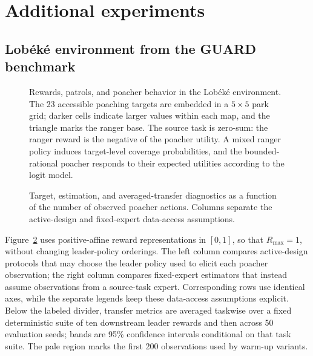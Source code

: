 \section{Additional experiments}

\subsection{Lob\'ek\'e environment from the GUARD benchmark}



\begin{figure}[H]
  \centering
  \resizebox{0.94\textwidth}{!}{%
  }
  \caption{Rewards, patrols, and poacher behavior in the Lob\'ek\'e environment.
  The 23 accessible poaching targets are embedded in a $5\times5$ park grid;
  darker cells indicate larger values within each map, and the triangle marks
  the ranger base. The source task is zero-sum: the ranger reward is the
  negative of the poacher utility. A mixed ranger policy induces target-level
  coverage probabilities, and the bounded-rational poacher responds to their
  expected utilities according to the logit model.}
  \label{fig:appendix-lobeke-environment}
\end{figure}

\begin{figure}[p]
  \centering
  \resizebox{\textwidth}{!}{%
  }
  \caption{Target, estimation, and averaged-transfer diagnostics as a function
  of the number of observed poacher actions. Columns separate the active-design
  and fixed-expert data-access assumptions.}
  \label{fig:appendix-lobeke-diagnostics}
\end{figure}
\clearpage

Figure~\ref{fig:appendix-lobeke-diagnostics} uses positive-affine reward
representations in $[0,1]$, so that $R_{\max}=1$, without changing leader-policy
orderings. The left column compares active-design protocols that may choose the
leader policy used to elicit each poacher observation; the right column compares
fixed-expert estimators that instead assume observations from a source-task
expert. Corresponding rows use identical axes, while the separate legends keep
these data-access assumptions explicit. Below the labeled divider, transfer
metrics are averaged taskwise over a fixed deterministic suite of ten downstream
leader rewards and then across 50 evaluation seeds; bands are 95\% confidence
intervals conditional on that task suite. The pale region marks the first 200
observations used by warm-up variants.

